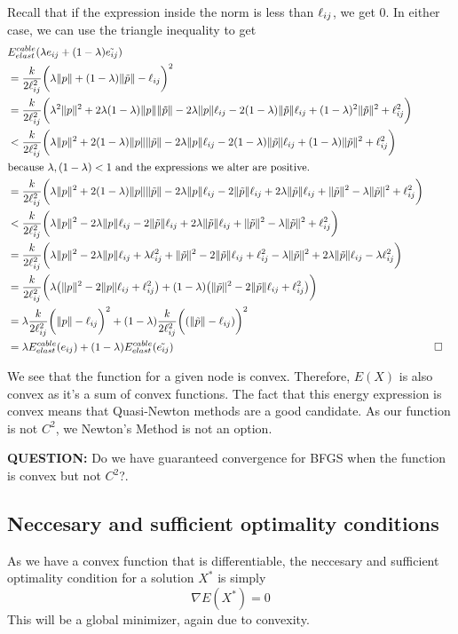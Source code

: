 Recall that if the expression inside the norm is less than $\ell_{ij}$, we get $0$. In either case, we can use the triangle inequality to get
\begin{align*}    
     &E^{cable}_{elast}(\lambda e_{ij} + (1-\lambda) \tilde{e_{ij}})\\ &=
      \frac{k}{2 \ell_{ij}^2} \bigg( \lambda \lVert p \rVert +( 1-\lambda ) \lVert \tilde{p} \rVert -\ell_{ij}\bigg)^2 \\ 
     &=\frac{k}{2 \ell_{ij}^2} \bigg( \lambda^2 \lVert p \rVert^2 + 2 \lambda (1-\lambda) \lVert p \rVert \lVert \tilde{p} \rVert -2 \lambda \lVert p \rVert \ell_{ij} -2(1-\lambda) \lVert \tilde{p} \rVert \ell_{ij} + (1-\lambda)^2 \lVert \tilde{p} \rVert^2 + \ell_{ij}^2 \bigg) \\
     &<\frac{k}{2 \ell_{ij}^2} \bigg( \lambda \lVert p \rVert^2 + 2 (1-\lambda) \lVert p \rVert \lVert \tilde{p} \rVert -2 \lambda \lVert p \rVert \ell_{ij} -2(1-\lambda) \lVert \tilde{p} \rVert \ell_{ij} + (1-\lambda) \lVert \tilde{p} \rVert^2 + \ell_{ij}^2 \bigg) \\ & \text{because }\lambda, (1-\lambda) < 1 \text{ and the expressions we alter are positive.} \\
     &= \frac{k}{2 \ell_{ij}^2} \bigg(\lambda \lVert p \rVert^2 + 2 (1-\lambda) \lVert p \rVert \lVert \tilde{p} \rVert - 2 \lambda \lVert p \rVert \ell_{ij} -2\lVert \tilde{p} \rVert \ell_{ij} +2 \lambda \lVert \tilde{p} \rVert \ell_{ij} + \lVert \tilde{p} \rVert^2 - \lambda \lVert \tilde{p} \rVert^2 + \ell_{ij}^2 \bigg) \\
     &< \frac{k}{2 \ell_{ij}^2} \bigg(\lambda \lVert p \rVert^2 - 2 \lambda \lVert p \rVert \ell_{ij} -2\lVert \tilde{p} \rVert \ell_{ij} +2 \lambda \lVert \tilde{p} \rVert \ell_{ij} + \lVert \tilde{p} \rVert^2 - \lambda \lVert \tilde{p} \rVert^2 + \ell_{ij}^2 \bigg)\\
     &= \frac{k}{2 \ell_{ij}^2} \bigg( \lambda \lVert p \rVert^2 - 2 \lambda \lVert p \rVert \ell_{ij} + \lambda \ell_{ij}^2 + \lVert \tilde{p} \rVert^2 - 2 \lVert \tilde{p} \rVert \ell_{ij} + \ell_{ij}^2 - \lambda \lVert \tilde{p} \rVert^2 + 2\lambda \lVert \tilde{p} \rVert \ell_{ij} - \lambda \ell_{ij}^2  \bigg)\\
     &= \frac{k}{2 \ell_{ij}^2} \bigg( \lambda \big(\lVert p \rVert^2 - 2 \lVert p \rVert \ell_{ij} + \ell_{ij}^2\big) + (1-\lambda) \big(\lVert \tilde{p} \rVert^2 -2 \lVert \tilde{p} \rVert \ell_{ij} + \ell_{ij}^2\big) \bigg)\\
     &= \lambda \frac{k}{2 \ell_{ij}^2}\bigg( \lVert p \rVert - \ell_{ij} \bigg)^2 + ( 1-\lambda )\frac{k}{2 \ell_{ij}^2}\bigg( ( \lVert \tilde{p} \rVert -\ell_{ij} ) \bigg)^2 
     \\&= \lambda E^{cable}_{elast}(e_{ij}) + (1-\lambda) E^{cable}_{elast}(\Tilde{e_{ij}})&&  \square
\end{align*}

We see that the function for a given node is convex. Therefore, $ E(X)$ is also convex as it's a sum of convex functions. The fact that this energy expression is convex means that Quasi-Newton methods are a good candidate. As our function is not $C^2$, we Newton's Method is not an option. 

\textbf{QUESTION:} Do we have guaranteed convergence for BFGS when the function is convex but not $C^2$?.

\subsection{Neccesary and sufficient optimality conditions}
As we have a convex function that is differentiable, the neccesary and sufficient optimality condition for a solution $X^*$ is simply \begin{equation}
    \nabla E(X^*) = 0
\end{equation}
This will be a global minimizer, again due to convexity.